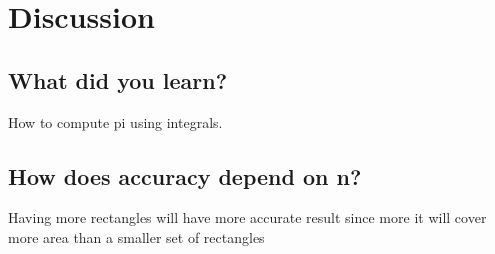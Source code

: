 \documentclass[12pt,letterpaper]{article}
\begin{document}
\section*{Discussion}\vspace{-15pt}
\subsection*{\normalsize What did you learn?}\vspace{-10pt}
How to compute pi using integrals.


\subsection*{\normalsize How does accuracy depend on n?}\vspace{-10pt}
Having more rectangles will have more accurate result since more it will cover more area than a smaller set of rectangles


\end{document}
